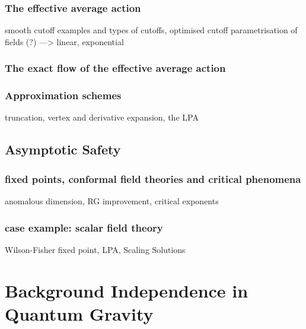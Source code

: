\documentclass[11pt]{book} %
\numberwithin{equation}{chapter}
\begin{document}


\subsection{The effective average action}

smooth cutoff examples and types of cutoffs, optimised cutoff
parametrisation of fields (?) ---> linear, exponential

\subsection{The exact flow of the effective average action}

\subsection{Approximation schemes}
truncation, vertex and derivative expansion, the LPA

\section{Asymptotic Safety}

\subsection{fixed points, conformal field theories and critical phenomena}
anomalous dimension, RG improvement, critical exponents
\subsection{case example: scalar field theory}
Wilson-Fisher fixed point, LPA, Scaling Solutions




\chapter{Background Independence in Quantum Gravity}
\end{document}
